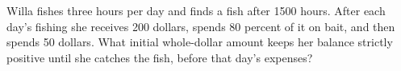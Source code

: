 Willa fishes three hours per day and finds a fish after 1500 hours. After each day's fishing she receives 200 dollars, spends 80 percent of it on bait, and then spends 50 dollars. What initial whole-dollar amount keeps her balance strictly positive until she catches the fish, before that day's expenses?
